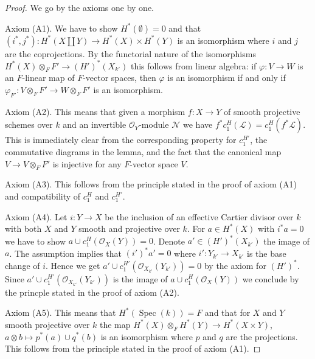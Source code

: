 \documentclass{stacks-project}
\theoremstyle{plain}
\theoremstyle{definition}
\theoremstyle{remark}
\numberwithin{equation}{subsection}
\def\Spec{\mathop{\mathrm{Spec}}}
\begin{document}
\begin{proof}
We go by the axioms one by one.

\medskip\noindent
Axiom (A1). We have to show $H^*(\emptyset) = 0$ and that
$(i^*, j^*) : H^*(X \amalg Y) \to H^*(X) \times H^*(Y)$
is an isomorphism where $i$ and $j$ are the coprojections.
By the functorial nature of the isomorphisms
$H^*(X) \otimes_F F' \to (H')^*(X_{k'})$ this
follows from linear algebra: if $\varphi : V \to W$ is an $F$-linear map
of $F$-vector spaces, then $\varphi$ is an isomorphism if and only if
$\varphi_{F'} : V \otimes_F F' \to W \otimes_F F'$ is an isomorphism.

\medskip\noindent
Axiom (A2). This means that given a morphism $f : X \to Y$ of smooth projective
schemes over $k$ and an invertible $\mathcal{O}_Y$-module $\mathcal{N}$
we have $f^*c_1^H(\mathcal{L}) = c_1^H(f^*\mathcal{L})$. This is immediately
clear from the corresponding property for $c_1^{H'}$, the commutative
diagrams in the lemma, and the fact that the canonical map
$V \to V \otimes_F F'$ is injective for any $F$-vector space $V$.

\medskip\noindent
Axiom (A3). This follows from the principle stated in the proof of
axiom (A1) and compatibility of $c_1^H$ and $c_1^{H'}$.

\medskip\noindent
Axiom (A4). Let $i : Y \to X$ be the inclusion of an effective
Cartier divisor over $k$ with both $X$ and $Y$ smooth and projective
over $k$. For $a \in H^*(X)$ with
$i^*a = 0$ we have to show $a \cup c_1^H(\mathcal{O}_X(Y)) = 0$.
Denote $a' \in (H')^*(X_{k'})$ the image of $a$.
The assumption implies that $(i')^*a' = 0$ where $i' : Y_{k'} \to X_{k'}$
is the base change of $i$. Hence we get
$a' \cup c_1^{H'}(\mathcal{O}_{X_{k'}}(Y_{k'})) = 0$ by the axiom
for $(H')^*$. Since $a' \cup c_1^{H'}(\mathcal{O}_{X_{k'}}(Y_{k'}))$
is the image of $a \cup c_1^H(\mathcal{O}_X(Y))$ we conclude by
the princple stated in the proof of axiom (A2).

\medskip\noindent
Axiom (A5). This means that $H^*(\Spec(k)) = F$ and that for $X$ and $Y$ smooth
projective over $k$ the map $H^*(X) \otimes_F H^*(Y) \to H^*(X \times Y)$,
$a \otimes b \mapsto p^*(a) \cup q^*(b)$ is an isomorphism
where $p$ and $q$ are the projections. This follows from the principle
stated in the proof of axiom (A1).


\end{proof}
\end{document}
